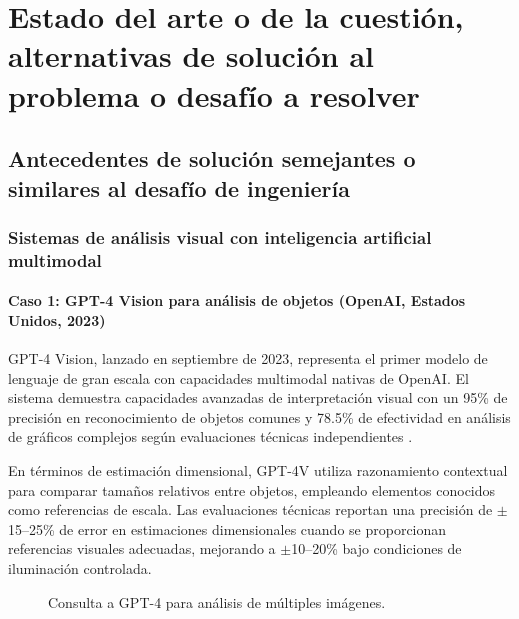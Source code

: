 
\chapter{Estado del arte o de la cuestión, alternativas de solución al problema o desafío a resolver}

\section{Antecedentes de solución semejantes o similares al desafío de ingeniería}

\subsection{Sistemas de análisis visual con inteligencia artificial multimodal}

\subsubsection{Caso 1: GPT-4 Vision para análisis de objetos (OpenAI, Estados Unidos, 2023)}

GPT-4 Vision, lanzado en septiembre de 2023, representa el primer modelo de lenguaje de gran escala con capacidades multimodal nativas de OpenAI. El sistema demuestra capacidades avanzadas de interpretación visual con un 95\% de precisión en reconocimiento de objetos comunes y 78.5\% de efectividad en análisis de gráficos complejos según evaluaciones técnicas independientes \cite{Yu2024}.

En términos de estimación dimensional, GPT-4V utiliza razonamiento contextual para comparar tamaños relativos entre objetos, empleando elementos conocidos como referencias de escala. Las evaluaciones técnicas reportan una precisión de $\pm$15--25\% de error en estimaciones dimensionales cuando se proporcionan referencias visuales adecuadas, mejorando a $\pm$10--20\% bajo condiciones de iluminación controlada.

\begin{figure}[H]
    \centering
    \caption{Consulta a GPT-4 para análisis de múltiples imágenes.}
    \label{fig:gpt4_vision}
\end{figure}

